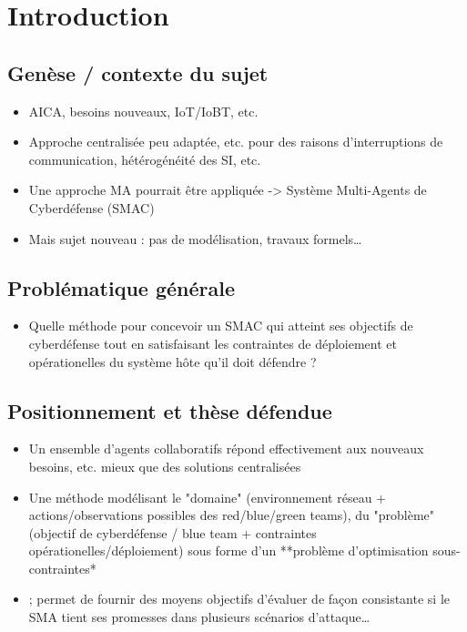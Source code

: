 \chapter{Introduction}\label{ch:introduction}

\section{Genèse / contexte du sujet}

\begin{itemize}
    \item AICA, besoins nouveaux, IoT/IoBT, etc.
    \item Approche centralisée peu adaptée, etc. pour des raisons d’interruptions de communication, hétérogénéité des SI, etc.
    \item Une approche MA pourrait être appliquée -> Système Multi-Agents de Cyberdéfense (SMAC)
    \item Mais sujet nouveau : pas de modélisation, travaux formels…
\end{itemize}

\section{Problématique générale}
\begin{itemize}

    \item Quelle méthode pour concevoir un SMAC qui atteint ses objectifs de cyberdéfense tout en satisfaisant les contraintes de déploiement et opérationelles du système hôte qu'il doit défendre ?
\end{itemize}

\section{Positionnement et thèse défendue}
\begin{itemize}

    \item Un ensemble d’agents collaboratifs répond effectivement aux nouveaux besoins, etc. mieux que des solutions centralisées
    \item Une méthode modélisant le "domaine" (environnement réseau + actions/observations possibles des red/blue/green teams), du "problème" (objectif de cyberdéfense / blue team + contraintes opérationelles/déploiement) sous forme d'un **problème d'optimisation sous-contraintes*\item ; permet de fournir des moyens objectifs d’évaluer de façon consistante si le SMA tient ses promesses dans plusieurs scénarios d’attaque…
\end{itemize}
